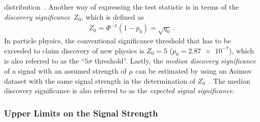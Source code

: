 distribution~\cite{Cowan:2010js}. Another way of expressing the test statistic
is in terms of the \emph{discovery significance}~$Z_0$, which is defined
as~\cite{Cowan:2010js}
\begin{align*}
  Z_0 = \Phi^{-1}(1 - p_0) = \sqrt{q_{0}} \,\text{.}
\end{align*}
In particle physics, the conventional significance threshold that has to be
exceeded to claim discovery of new physics is $Z_0 = 5$ ($p_0 = \num{2.87e-7}$),
which is also referred to as the ``$5\sigma$ threshold''. Lastly, the
\emph{median discovery significance} of a signal with an assumed strength of
$\mu$ can be estimated by using an Asimov dataset with the same signal strength
in the determination of $Z_0$~\cite{Cowan:2010js}. The median discovery
significance is also referred to as the \emph{expected signal significance}.

\subsubsection{Upper Limits on the Signal Strength}

